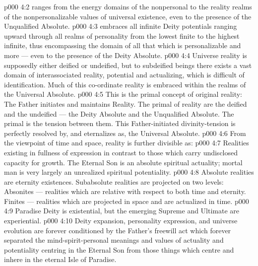 \vs p000 4:2 \bibnobreakspace {} ranges from the energy domains of the nonpersonal to the reality realms of the nonpersonalizable values of universal existence, even to the presence of the Unqualified Absolute.
\vs p000 4:3 \bibnobreakspace {} embraces all infinite Deity potentials ranging upward through all realms of personality from the lowest finite to the highest infinite, thus encompassing the domain of all that which is personalizable and more --- even to the presence of the Deity Absolute.
\vs p000 4:4 \bibnobreakspace {} Universe reality is supposedly either deified or undeified, but to subdeified beings there exists a vast domain of interassociated reality, potential and actualizing, which is difficult of identification. Much of this co\hyp{}ordinate reality is embraced within the realms of the Universal Absolute.
\vs p000 4:5 This is the primal concept of original reality: The Father initiates and maintains Reality. The primal  of reality are the deified and the undeified --- the Deity Absolute and the Unqualified Absolute. The primal  is the tension between them. This Father\hyp{}initiated divinity\hyp{}tension is perfectly resolved by, and eternalizes as, the Universal Absolute.
\vs p000 4:6 \pc From the viewpoint of time and space, reality is further divisible as:
\vs p000 4:7 \bibnobreakspace {} Realities existing in fullness of expression in contrast to those which carry undisclosed capacity for growth. The Eternal Son is an absolute spiritual actuality; mortal man is very largely an unrealized spiritual potentiality.
\vs p000 4:8 \bibnobreakspace {} Absolute realities are eternity existences. Subabsolute realities are projected on two levels: Absonites --- realities which are relative with respect to both time and eternity. Finites --- realities which are projected in space and are actualized in time.
\vs p000 4:9 \bibnobreakspace {} Paradise Deity is existential, but the emerging Supreme and Ultimate are experiential.
\vs p000 4:10 \bibnobreakspace {} Deity expansion, personality expression, and universe evolution are forever conditioned by the Father’s freewill act which forever separated the mind\hyp{}spirit\hyp{}personal meanings and values of actuality and potentiality centring in the Eternal Son from those things which centre and inhere in the eternal Isle of Paradise.

